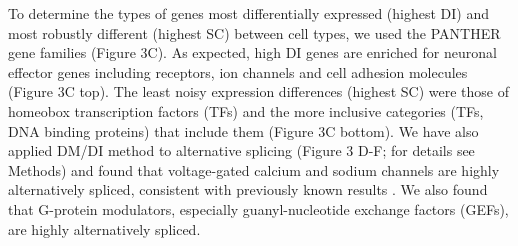 To determine the types of genes most differentially expressed (highest DI) and most robustly different (highest SC) between cell types, we used the PANTHER \citep{Thomas_2003} gene families (Figure 3C). As expected, high DI genes are enriched for neuronal effector genes including receptors, ion channels and cell adhesion molecules (Figure 3C top). The least noisy expression differences (highest SC) were those of homeobox transcription factors (TFs) and the more inclusive categories (TFs, DNA binding proteins) that include them (Figure 3C bottom). We have also applied DM/DI method to alternative splicing (Figure 3 D-F; for details see Methods) and found that voltage-gated calcium and sodium channels are highly alternatively spliced, consistent with previously known results \citep[e.g.][]{Lipscombe_2013}. We also found that G-protein modulators, especially guanyl-nucleotide exchange factors (GEFs), are highly alternatively spliced. 






















